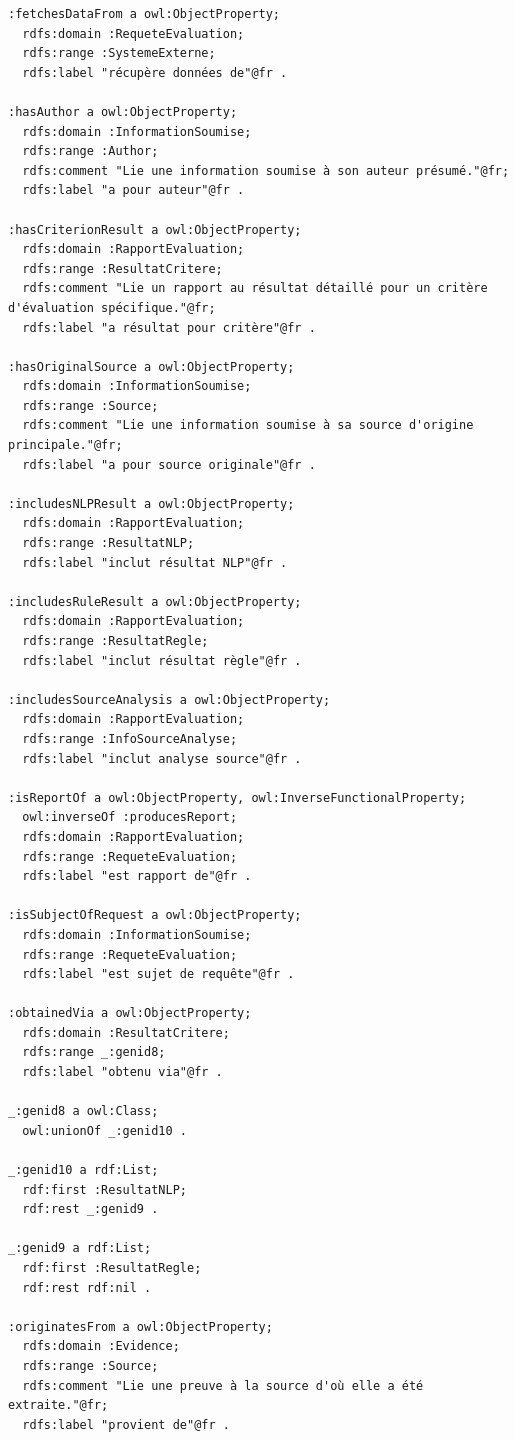 \documentclass[9pt,twocolumn,french]{article}
\begin{document}
\begin{lstlisting}[language=Turtle,basicstyle=\ttfamily\tiny,frame=single]
:fetchesDataFrom a owl:ObjectProperty;
  rdfs:domain :RequeteEvaluation;
  rdfs:range :SystemeExterne;
  rdfs:label "récupère données de"@fr .

:hasAuthor a owl:ObjectProperty;
  rdfs:domain :InformationSoumise;
  rdfs:range :Author;
  rdfs:comment "Lie une information soumise à son auteur présumé."@fr;
  rdfs:label "a pour auteur"@fr .

:hasCriterionResult a owl:ObjectProperty;
  rdfs:domain :RapportEvaluation;
  rdfs:range :ResultatCritere;
  rdfs:comment "Lie un rapport au résultat détaillé pour un critère d'évaluation spécifique."@fr;
  rdfs:label "a résultat pour critère"@fr .

:hasOriginalSource a owl:ObjectProperty;
  rdfs:domain :InformationSoumise;
  rdfs:range :Source;
  rdfs:comment "Lie une information soumise à sa source d'origine principale."@fr;
  rdfs:label "a pour source originale"@fr .

:includesNLPResult a owl:ObjectProperty;
  rdfs:domain :RapportEvaluation;
  rdfs:range :ResultatNLP;
  rdfs:label "inclut résultat NLP"@fr .

:includesRuleResult a owl:ObjectProperty;
  rdfs:domain :RapportEvaluation;
  rdfs:range :ResultatRegle;
  rdfs:label "inclut résultat règle"@fr .

:includesSourceAnalysis a owl:ObjectProperty;
  rdfs:domain :RapportEvaluation;
  rdfs:range :InfoSourceAnalyse;
  rdfs:label "inclut analyse source"@fr .

:isReportOf a owl:ObjectProperty, owl:InverseFunctionalProperty;
  owl:inverseOf :producesReport;
  rdfs:domain :RapportEvaluation;
  rdfs:range :RequeteEvaluation;
  rdfs:label "est rapport de"@fr .

:isSubjectOfRequest a owl:ObjectProperty;
  rdfs:domain :InformationSoumise;
  rdfs:range :RequeteEvaluation;
  rdfs:label "est sujet de requête"@fr .

:obtainedVia a owl:ObjectProperty;
  rdfs:domain :ResultatCritere;
  rdfs:range _:genid8;
  rdfs:label "obtenu via"@fr .

_:genid8 a owl:Class;
  owl:unionOf _:genid10 .

_:genid10 a rdf:List;
  rdf:first :ResultatNLP;
  rdf:rest _:genid9 .

_:genid9 a rdf:List;
  rdf:first :ResultatRegle;
  rdf:rest rdf:nil .

:originatesFrom a owl:ObjectProperty;
  rdfs:domain :Evidence;
  rdfs:range :Source;
  rdfs:comment "Lie une preuve à la source d'où elle a été extraite."@fr;
  rdfs:label "provient de"@fr .


\end{lstlisting}
\end{document}
